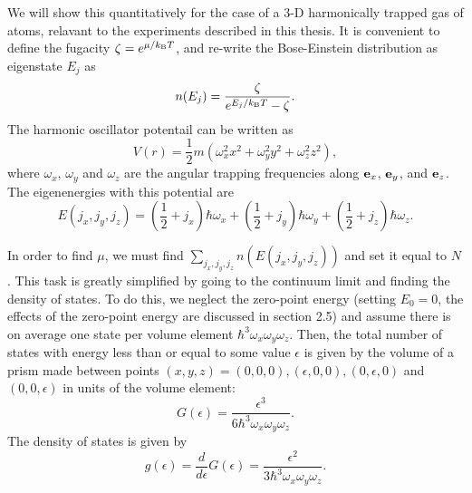 We will show this quantitatively for the case of a 3-D harmonically trapped gas of atoms, relavant to the experiments described in this thesis. It is convenient to define the fugacity $\zeta=e^{\mu/k_{\rm B}T}$, and re-write the Bose-Einstein distribution as 
eigenstate $E_j$ as
\begin{equation}
n(E_j) = \frac{\zeta}{e^{E_j/k_{\rm B}T}-\zeta}.
\end{equation}
The harmonic oscillator potentail can be written as 
\begin{equation}
V(r) = \frac{1}{2} m (\omega_x^2 x^2 + \omega_y^2 y^2 + \omega_z^2 z^2),
\end{equation}
where $\omega_x$, $\omega_y$ and $\omega_z$ are the angular trapping frequencies along ${\bf e}_x$, ${\bf e}_y$, and ${\bf e}_z$.  The eigenenergies with this potential are
\begin{equation}
E(j_x,j_y,j_z) = (\frac{1}{2} + j_x)\hbar\omega_x +(\frac{1}{2} + j_y)\hbar\omega_y+(\frac{1}{2} + j_z)\hbar\omega_z.
\end{equation}

In order to find $\mu$, we must find $\sum_{j_x,j_y,j_z}n(E(j_x,j_y,j_z))$ and set it equal to $N$. This task is greatly simplified by going to the continuum limit and finding the density of states. To do this, we neglect the zero-point energy (setting $E_0=0$, the effects of the zero-point energy are discussed in \cite{Pethick} section 2.5)  and assume there is on average one state per volume element $\hbar^3 \omega_x \omega_y \omega_z$. Then, the total number of states with energy less than or equal to some value $\epsilon$ is given by the volume of a prism made between points $(x,y,z)=(0,0,0),(\epsilon,0,0),(0,\epsilon,0)$ and $(0,0,\epsilon)$ in units of the volume element:
\begin{equation}
G(\epsilon) = \frac{\epsilon^3}{6\hbar^3\omega_x \omega_y \omega_z}.
\label{eqn:numberOfStates}
\end{equation}
The density of states is given by 
\begin{equation}
g(\epsilon) = \frac{d}{d\epsilon} G(\epsilon) = \frac{\epsilon^2}{3\hbar^3\omega_x \omega_y \omega_z}. 
\label{eqn:densityOfStates}
\end{equation}

